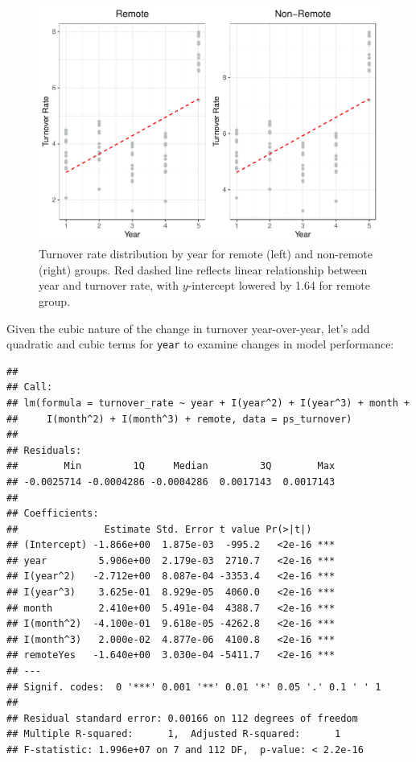 \documentclass[
]{book}
\begin{document}
\begin{figure}

{\centering \includegraphics[width=1\linewidth]{The_Fundamentals_of_People_Analytics_files/figure-latex/ps-turnover-yrly-dist-1} 

}

\caption{Turnover rate distribution by year for remote (left) and non-remote (right) groups. Red dashed line reflects linear relationship between year and turnover rate, with $y$-intercept lowered by 1.64 for remote group.}\label{fig:ps-turnover-yrly-dist}
\end{figure}

Given the cubic nature of the change in turnover year-over-year, let's add quadratic and cubic terms for \texttt{year} to examine changes in model performance:

\begin{verbatim}
## 
## Call:
## lm(formula = turnover_rate ~ year + I(year^2) + I(year^3) + month + 
##     I(month^2) + I(month^3) + remote, data = ps_turnover)
## 
## Residuals:
##        Min         1Q     Median         3Q        Max 
## -0.0025714 -0.0004286 -0.0004286  0.0017143  0.0017143 
## 
## Coefficients:
##               Estimate Std. Error t value Pr(>|t|)    
## (Intercept) -1.866e+00  1.875e-03  -995.2   <2e-16 ***
## year         5.906e+00  2.179e-03  2710.7   <2e-16 ***
## I(year^2)   -2.712e+00  8.087e-04 -3353.4   <2e-16 ***
## I(year^3)    3.625e-01  8.929e-05  4060.0   <2e-16 ***
## month        2.410e+00  5.491e-04  4388.7   <2e-16 ***
## I(month^2)  -4.100e-01  9.618e-05 -4262.8   <2e-16 ***
## I(month^3)   2.000e-02  4.877e-06  4100.8   <2e-16 ***
## remoteYes   -1.640e+00  3.030e-04 -5411.7   <2e-16 ***
## ---
## Signif. codes:  0 '***' 0.001 '**' 0.01 '*' 0.05 '.' 0.1 ' ' 1
## 
## Residual standard error: 0.00166 on 112 degrees of freedom
## Multiple R-squared:      1,  Adjusted R-squared:      1 
## F-statistic: 1.996e+07 on 7 and 112 DF,  p-value: < 2.2e-16
\end{verbatim}
\end{document}
